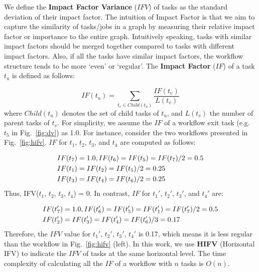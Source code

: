 \documentclass[final]{IEEEtran}
\begin{document}
We define the \textbf{Impact Factor Variance} ($IFV$) of tasks as the standard deviation of their impact factor. The intuition of Impact Factor is that we aim to capture the similarity of tasks/jobs in a graph by measuring their relative impact factor or importance to the entire graph. Intuitively speaking, tasks with similar impact factors should be merged together compared to tasks with different impact factors. Also, if all the tasks have similar impact factors, the workflow structure tends to be more `even' or `regular'. The \textbf{Impact Factor} ($IF$) of a task $t_u$ is defined as follows:


\begin{equation}
	IF(t_u)=\sum_{t_v\in Child(t_u)}^{}\frac{IF(t_v)}{L(t_v)}
\end{equation}
where $Child(t_u)$ denotes the set of child tasks of $t_u$, and $L(t_v)$ the number of parent tasks of $t_v$. For simplicity, we assume the $IF$ of a workflow exit task (e.g. $t_5$ in Fig.~\ref{fig:dv}) as 1.0. For instance, consider the two workflows presented in Fig.~\ref{fig:hifv}. $IF$ for $t_1$, $t_2$, $t_3$, and $t_4$ are computed as follows:

\begin{eqnarray}
	\displaystyle  
	&IF(t_7 )=1.0, IF(t_6 )=IF(t_5 )=IF(t_7 )/2=0.5\nonumber  \\
	&IF(t_1 )=IF(t_2 )=IF(t_5 )/2=0.25\nonumber \\
	&IF(t_3 )=IF(t_4 )=IF(t_6 )/2=0.25\nonumber 
\end{eqnarray}
Thus, IFV($t_1$, $t_2$, $t_3$, $t_4$) = 0. In contrast, $IF$ for $t_1'$, $t_2'$, $t_3'$, and $t_4'$ are:

\begin{eqnarray}
	\displaystyle  
	&IF(t_7')=1.0, IF(t_6')=IF(t_5')=IF(t_1')=IF(t_7')/2=0.5\nonumber \\
	&IF(t_2')=IF(t_3')=IF(t_4')=IF(t_6')/3=0.17 \nonumber
\end{eqnarray}
Therefore, the $IFV$ value for {$t_1'$, $t_2'$, $t_3'$, $t_4'$} is 0.17, which means it is less regular than the workflow in Fig.~\ref{fig:hifv} (left). In this work, we use \textbf{HIFV} (Horizontal IFV) to indicate the $IFV$ of tasks at the same horizontal level. The time complexity of calculating all the $IF$ of a workflow with $n$ tasks is $O(n)$.  
\end{document}
